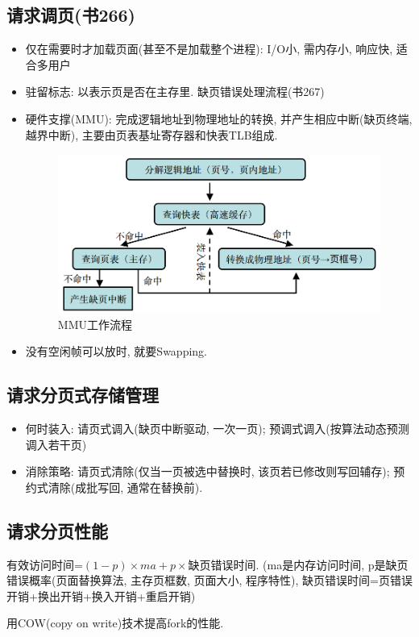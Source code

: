 \documentclass[a4paper, UTF8]{article}
\begin{document}
\subsection{请求调页(书266)}
\begin{itemize}
\item 仅在需要时才加载页面(甚至不是加载整个进程): I/O小, 需内存小, 响应快, 适合多用户
\item 驻留标志: 以表示页是否在主存里. 缺页错误处理流程(书267)
\item 硬件支撑(MMU): 完成逻辑地址到物理地址的转换, 并产生相应中断(缺页终端, 越界中断), 主要由页表基址寄存器和快表TLB组成.
\begin{figure}[H]
	\centering
	\includegraphics[scale=0.3]{MMU.png}
	\caption{MMU工作流程}
\end{figure}\par
\item 没有空闲帧可以放时, 就要Swapping.
\end{itemize}

\subsection{请求分页式存储管理}
\begin{itemize}
\item 何时装入: 请页式调入(缺页中断驱动, 一次一页); 预调式调入(按算法动态预测调入若干页)
\item 消除策略: 请页式清除(仅当一页被选中替换时, 该页若已修改则写回辅存); 预约式清除(成批写回, 通常在替换前).
\end{itemize}

\subsection{请求分页性能}
有效访问时间=$(1-p)\times ma+p\times $缺页错误时间. (ma是内存访问时间, p是缺页错误概率(页面替换算法, 主存页框数, 页面大小, 程序特性), 缺页错误时间=页错误开销+换出开销+换入开销+重启开销)\par
用COW(copy on write)技术提高fork的性能.\par
\end{document}
